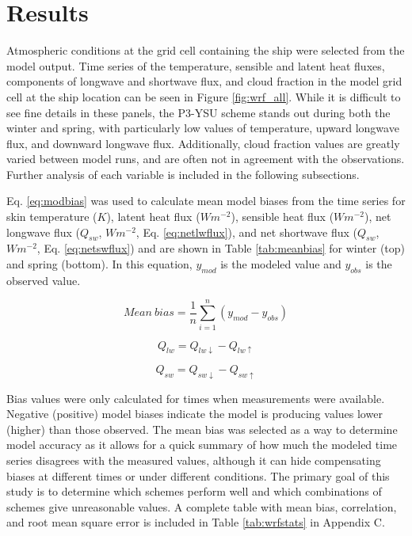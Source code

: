 \section{Results}
Atmospheric conditions at the grid cell containing the ship were selected from the model output. Time series of the temperature, sensible and latent heat fluxes, components of longwave and shortwave flux, and cloud fraction in the model grid cell at the ship location can be seen in Figure \ref{fig:wrf_all}. While it is difficult to see fine details in these panels, the P3-YSU scheme stands out during both the winter and spring, with particularly low values of temperature, upward longwave flux, and downward longwave flux. Additionally, cloud fraction values are greatly varied between model runs, and are often not in agreement with the observations. Further analysis of each variable is included in the following subsections.

Eq. \ref{eq:modbias} was used to calculate mean model biases from the time series for skin temperature ($K$), latent heat flux ($Wm^{-2}$), sensible heat flux ($Wm^{-2}$), net longwave flux ($Q_{sw}$, $Wm^{-2}$, Eq. \ref{eq:netlwflux}), and net shortwave flux ($Q_{sw}$, $Wm^{-2}$, Eq. \ref{eq:netswflux}) and are shown in Table \ref{tab:meanbias} for winter (top) and spring (bottom). In this equation, $y_{mod}$ is the modeled value and $y_{obs}$ is the observed value.
 
\begin{equation}\label{eq:modbias}
Mean~bias = \frac{1}{n}\sum^{n}_{i=1}(y_{mod} - y_{obs})
\end{equation}

\begin{equation}\label{eq:netlwflux}
Q_{lw} = Q_{lw \downarrow} - Q_{lw \uparrow}
\end{equation}

\begin{equation}\label{eq:netswflux}
Q_{sw} = Q_{sw \downarrow} - Q_{sw \uparrow}
\end{equation}

 Bias values were only calculated for times when measurements were available. Negative (positive) model biases indicate the model is producing values lower (higher) than those observed. The mean bias was selected as a way to determine model accuracy as it allows for a quick summary of how much the modeled time series disagrees with the measured values, although it can hide compensating biases at different times or under different conditions. The primary goal of this study is to determine which schemes perform well and which combinations of schemes give unreasonable values. A complete table with mean bias, correlation, and root mean square error is included in Table \ref{tab:wrfstats} in Appendix C. 

